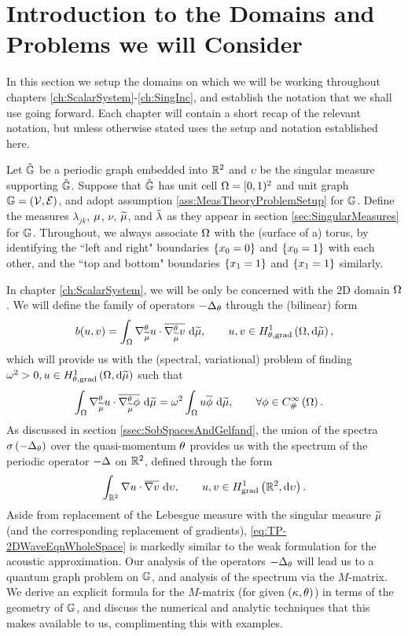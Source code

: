 \section{Introduction to the Domains and Problems we will Consider} \label{sec:TP-DomainSetup}
In this section we setup the domains on which we will be working throughout chapters \ref{ch:ScalarSystem}-\ref{ch:SingInc}, and establish the notation that we shall use going forward.
Each chapter will contain a short recap of the relevant notation, but unless otherwise stated uses the setup and notation established here.

Let $\hat{\mathbb{G}}$ be a periodic graph embedded into $\mathbb{R}^2$ and $\upsilon$ be the singular measure supporting $\hat{\mathbb{G}}$.
Suppose that $\hat{\mathbb{G}}$ has unit cell $\Omega=[0,1)^2$ and unit graph $\mathbb{G}=\left( \mathcal{V}, \mathcal{E} \right)$, and adopt assumption \ref{ass:MeasTheoryProblemSetup} for $\mathbb{G}$.
Define the measures $\lambda_{jk}$, $\mu$, $\nu$, $\widetilde{\mu}$, and $\tilde{\lambda}$ as they appear in section \ref{sec:SingularMeasures} for $\mathbb{G}$.
Throughout, we always associate $\Omega$ with the (surface of a) torus, by identifying the ``left and right" boundaries $\left\{ x_0=0 \right\}$ and $\left\{ x_0=1 \right\}$ with each other, and the ``top and bottom" boundaries $\left\{ x_1=1 \right\}$ and $\left\{ x_1=1 \right\}$ similarly.

In chapter \ref{ch:ScalarSystem}, we will be only be concerned with the 2D domain $\Omega$.
We will define the family of operators $-\Delta_{\theta}$ through the (bilinear) form 
\begin{align*}
	b(u,v) = \int_{\Omega} \nabla^{\theta}_{\widetilde{\mu}} u\cdot\overline{\nabla^{\theta}_{\widetilde{\mu}} v}  \ \mathrm{d}\widetilde{\mu},
	\qquad u,v\in H^1_{\theta, \mathrm{grad}}\left( \Omega, \mathrm{d}\widetilde{\mu} \right),
\end{align*}
which will provide us with the (spectral, variational) problem of finding $\omega^2>0, u\in H^1_{\theta, \mathrm{grad}}\left( \Omega, \mathrm{d}\widetilde{\mu} \right)$ such that
\begin{align*}
	\int_{\Omega} \nabla^{\theta}_{\widetilde{\mu}} u\cdot\overline{\nabla^{\theta}_{\widetilde{\mu}}\phi}  \ \mathrm{d}\widetilde{\mu}
	&= \omega^2\int_{\Omega} u\overline{\phi}  \ \mathrm{d}\widetilde{\mu},
	\qquad\forall\phi\in C^{\infty}_{\#}\left( \Omega \right).
\end{align*}
As discussed in section \ref{ssec:SobSpacesAndGelfand}, the union of the spectra $\sigma\left( -\Delta_{\theta} \right)$ over the quasi-momentum $\theta$ provides us with the spectrum of the periodic operator $-\Delta$ on $\mathbb{R}^2$, defined through the form
\begin{align} \label{eq:TP-2DWaveEqnWholeSpace}
	\int_{\mathbb{R}^2} \nabla u\cdot\overline{\nabla v}  \ \mathrm{d}\upsilon,
	\qquad u,v\in H^1_\mathrm{grad}\left( \mathbb{R}^2, \mathrm{d}\upsilon \right).
\end{align}
Aside from replacement of the Lebesgue measure with the singular measure $\widetilde{\mu}$ (and the corresponding replacement of gradients), \eqref{eq:TP-2DWaveEqnWholeSpace} is markedly similar to the weak formulation for the acoustic approximation.
Our analysis of the operators $-\Delta_{\theta}$ will lead us to a quantum graph problem on $\mathbb{G}$, and analysis of the spectrum via the $M$-matrix.
We derive an explicit formula for the $M$-matrix (for given $\left( \kappa, \theta \right)$) in terms of the geometry of $\mathbb{G}$, and discuss the numerical and analytic techniques that this makes available to us, complimenting this with examples.

